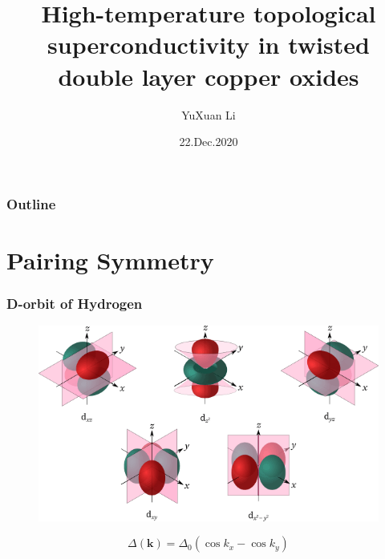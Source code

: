\documentclass{beamer}
\title[CMT.SCNU]{High-temperature topological superconductivity in twisted double layer copper oxides}
\author[YuXuan Li]
{YuXuan Li\inst{1}}
\institute[Physics@SCNU] 
{
  \inst{1}%
  Department of Physics\\
 South China Normal University 
}
\date[SCNU]{22.Dec.2020}
\begin{document}
  \frame{\titlepage}

  \begin{frame}
    \frametitle{Outline}
    \tableofcontents
  \end{frame}
\section{Pairing Symmetry}
\begin{frame}
\frametitle{D-orbit of Hydrogen}
\begin{figure}[h]
	\centering
	\includegraphics[scale=0.4]{pic/p2.png}
\end{figure}
\begin{equation}
\Delta(\mathbf{k})=\Delta_0(\cos k_x-\cos k_y)
\end{equation}
\end{frame}
\end{document}

